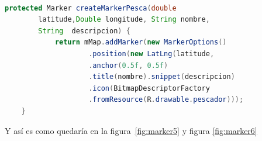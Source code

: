  

\begin{lstlisting}[language=java,caption={Creación de Marker  personalizados},label=DescriptiveLabel]
    
protected Marker createMarkerPesca(double
		latitude,Double longitude, String nombre,
		String	descripcion) {
       		return mMap.addMarker(new MarkerOptions()
                	.position(new LatLng(latitude, 							longitude))
                	.anchor(0.5f, 0.5f)
                	.title(nombre).snippet(descripcion)
	                .icon(BitmapDescriptorFactory
    	       		.fromResource(R.drawable.pescador)));
    }


\end{lstlisting} 
 
 
 
 Y así es como quedaría en la figura~\ref{fig:marker5} y figura \ref{fig:marker6}

 
 
